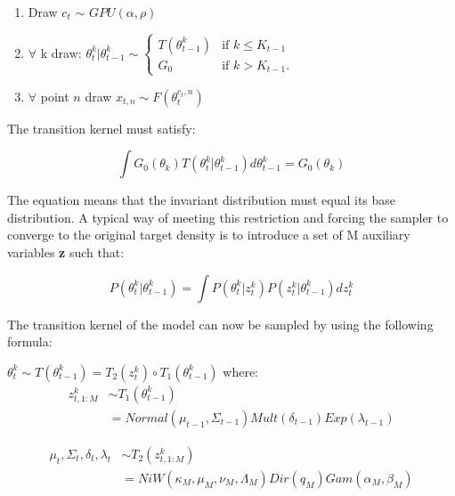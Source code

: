\documentclass [twoside,hidelinks]{article}
\begin{document}
\noindent\makebox [\linewidth]{\rule{\textwidth}{0.4pt}}
\begin{enumerate}
	\item Draw  $c_t$ $\sim$ $GPU (\alpha, \rho) $
	\item $\forall$  k draw: $ \theta_t^k | \theta_{t-1}^k \sim
	\begin{cases} T  (\theta_{t-1}^k) &\mbox{if } k \leq K_{t-1} \\
	G_0 & \mbox{if } k > K_{t-1}. \end{cases}$
	\item $\forall$  point $n$ draw $ x_{t,n} \sim F (\theta_t^{c_t,n})$
\end{enumerate}
\noindent\makebox [\linewidth]{\rule{\textwidth}{0.4pt}}
The transition kernel must satisfy\cite{caron}:

\begin{equation}
\int G_0 (\theta_k) T (\theta_t^k | \theta_{t-1}^k) d\theta_{t-1}^k =  G_0 (\theta_k)
\end{equation}

The equation means that the invariant distribution must equal its base distribution. A typical way of meeting this restriction and forcing the sampler to converge to the original target density\cite{smc:theory} is to introduce a set of M auxiliary variables \textbf{z} such that:

\begin{equation}
    P (\theta_t^k | \theta_{t-1}^k) =  \int P (\theta_t^k | z_{t}^k)   P (z_t^k| \theta_{t-1}^k) dz_t^k
\end{equation}

The transition kernel of the model can now be sampled by using the following formula:

$\theta_t^k \sim T (\theta_{t-1}^k) = T_2 (z_t^k) \circ T_1 (\theta_{t-1}^k)$ where:
\begin{equation} \label{eq1}
\begin{split}
    z_{t,1:M}^k  & \sim T_1 (\theta_{t-1}^k)\\
 & = Normal (\mu_{t-1}, \Sigma_{t-1}) Mult ( \delta_{t-1}) Exp ( \lambda_{t-1})
\end{split}
\end{equation}

\begin{equation}
\begin{split}
    \mu_t, \Sigma_t, \delta_t,  \lambda_t & \sim T_2 (z_{t,1:M}^k)\\
 & = NiW ( \kappa_M, \mu_M, \nu_M, \Lambda_M ) Dir (q_M) Gam (\alpha_M, \beta_M) 
\end{split}
\end{equation}
\end{document}
